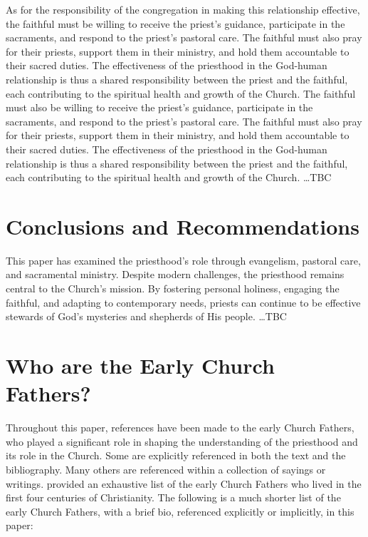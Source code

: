 \documentclass[12pt, doc]{apa7}   	%
\begin{document}
As for the responsibility of the congregation in making this relationship effective, the faithful must be willing to receive the priest’s guidance, participate in the sacraments, and respond to the priest’s pastoral care.  The faithful must also pray for their priests, support them in their ministry, and hold them accountable to their sacred duties.  The effectiveness of the priesthood in the God-human relationship is thus a shared responsibility between the priest and the faithful, each contributing to the spiritual health and growth of the Church.  The faithful must also be willing to receive the priest’s guidance, participate in the sacraments, and respond to the priest’s pastoral care.  The faithful must also pray for their priests, support them in their ministry, and hold them accountable to their sacred duties.  The effectiveness of the priesthood in the God-human relationship is thus a shared responsibility between the priest and the faithful, each contributing to the spiritual health and growth of the Church. \dots TBC

\section{Conclusions and Recommendations}

This paper has examined the priesthood’s role through evangelism, pastoral care, and sacramental ministry. Despite modern challenges, the priesthood remains central to the Church’s mission. By fostering personal holiness, engaging the faithful, and adapting to contemporary needs, priests can continue to be effective stewards of God’s mysteries and shepherds of His people. \dots TBC


\appendix{}
\section{Who are the Early Church Fathers?}\label{early_fathers}
Throughout this paper, references have been made to the early Church Fathers, who played a significant role in shaping the understanding of the priesthood and its role in the Church.  Some are explicitly referenced in both the text and the bibliography.  Many others are referenced within a collection of sayings or writings. \citet{early_church_akin} provided an exhaustive list of the early Church Fathers who lived in the first four centuries of Christianity.  The following is a much shorter list of the early Church Fathers, with a brief bio, referenced explicitly or implicitly, in this paper:
\end{document}
